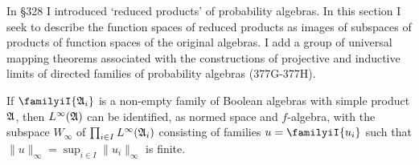 
\def\chaptername{Linear operators between function spaces}
\def\sectionname{Function spaces of reduced products}


In \S328 I introduced `reduced products' of probability algebras.   In this
section I seek to describe the function spaces of reduced products as
images of subspaces of products of function spaces of the original
algebras.   I add a group of universal mapping theorems associated
with the constructions of projective and inductive limits of directed
families of probability algebras (377G-377H).

 If $\familyiI{\frak A_i}$ is a
non-empty family of Boolean
algebras with simple product $\frak A$, then $L^{\infty}(\frak A)$ can be
identified, as normed space and $f$-algebra, with the subspace
$W_{\infty}$ of $\prod_{i\in I}L^{\infty}(\frak A_i)$
consisting of families $u=\familyiI{u_i}$ such that
$\|u\|_{\infty}=\sup_{i\in I}\|u_i\|_{\infty}$ is finite.


